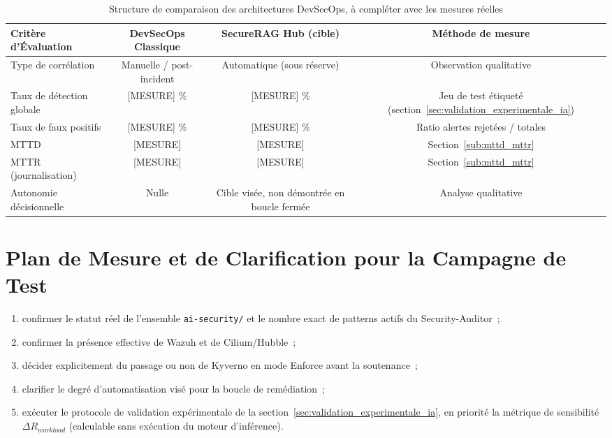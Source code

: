 \begin{table}[htbp]
\centering
\scriptsize
\begin{tabular}{@{}lccc@{}}
\toprule
\textbf{Critère d'Évaluation} & \textbf{DevSecOps Classique} & \textbf{SecureRAG Hub (cible)} & \textbf{Méthode de mesure} \\
\midrule
Type de corrélation & Manuelle / post-incident & Automatique (sous réserve) & Observation qualitative \\
Taux de détection globale & [MESURE] \% & [MESURE] \% & Jeu de test étiqueté (section~\ref{sec:validation_experimentale_ia}) \\
Taux de faux positifs & [MESURE] \% & [MESURE] \% & Ratio alertes rejetées / totales \\
MTTD & [MESURE] & [MESURE] & Section~\ref{sub:mttd_mttr} \\
MTTR (journalisation) & [MESURE] & [MESURE] & Section~\ref{sub:mttd_mttr} \\
Autonomie décisionnelle & Nulle & Cible visée, non démontrée en boucle fermée & Analyse qualitative \\
\bottomrule
\end{tabular}
\caption{Structure de comparaison des architectures DevSecOps, à compléter avec les mesures réelles}
\label{tab:sota_comparison}
\end{table}

\section{Plan de Mesure et de Clarification pour la Campagne de Test}

\begin{enumerate}
    \item confirmer le statut réel de l'ensemble \texttt{ai-security/} et le nombre exact de patterns actifs du Security-Auditor~;
    \item confirmer la présence effective de Wazuh et de Cilium/Hubble~;
    \item décider explicitement du passage ou non de Kyverno en mode Enforce avant la soutenance~;
    \item clarifier le degré d'automatisation visé pour la boucle de remédiation~;
    \item exécuter le protocole de validation expérimentale de la section~\ref{sec:validation_experimentale_ia}, en priorité la métrique de sensibilité $\Delta R_{workload}$ (calculable sans exécution du moteur d'inférence).
\end{enumerate}

